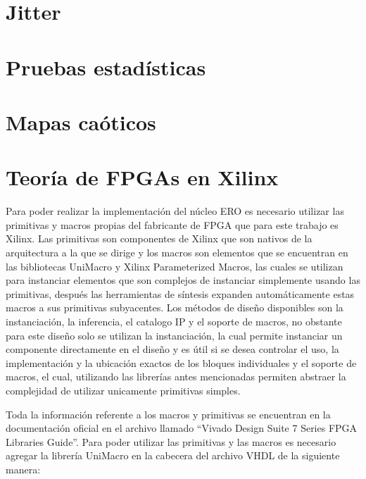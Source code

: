     \section{Jitter}
    \section{Pruebas estadísticas}
    \section{Mapas caóticos}

    \cite{Sprott2003}

    \cite{Strogatz1994}

    \cite{Gleick1987}




    \section{Teoría de FPGAs en Xilinx}
        Para poder realizar la implementación del núcleo ERO es necesario utilizar las primitivas y macros propias del fabricante de FPGA que para este trabajo es Xilinx. Las primitivas son componentes de Xilinx que son nativos de la arquitectura a la que se dirige y los macros son elementos que se encuentran en las bibliotecas UniMacro y Xilinx Parameterized Macros, las cuales se utilizan para instanciar elementos que son complejos de instanciar simplemente usando las primitivas, después las herramientas de síntesis expanden automáticamente estas macros a sus primitivas subyacentes. Los métodos de diseño disponibles son la instanciación, la inferencia, el catalogo IP y el soporte de macros, no obstante para este diseño solo se utilizan la instanciación, la cual permite instanciar un componente directamente en el diseño y es útil si se desea controlar el uso, la implementación y la ubicación exactos de los bloques individuales y el soporte de macros, el cual, utilizando las librerías antes mencionadas permiten abstraer la complejidad de utilizar unicamente primitivas simples.

        Toda la información referente a los macros y primitivas se encuentran en la documentación oficial en el archivo llamado ``Vivado Design Suite 7 Series FPGA Libraries Guide''. Para poder utilizar las primitivas y las macros es necesario agregar la librería UniMacro en la cabecera del archivo VHDL de la siguiente manera: 

        \vspace{0.4cm}
        

